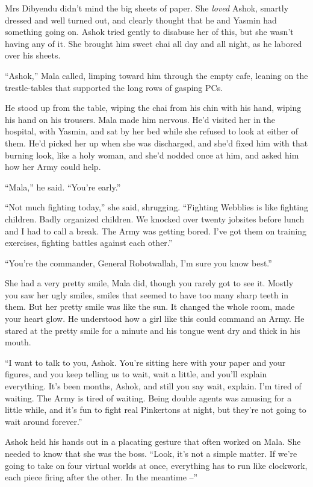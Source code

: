 Mrs Dibyendu didn't mind the big sheets of paper. She \emph{loved}
Ashok, smartly dressed and well turned out, and clearly thought
that he and Yasmin had something going on. Ashok tried gently to
disabuse her of this, but she wasn't having any of it. She brought
him sweet chai all day and all night, as he labored over his
sheets.

``Ashok,'' Mala called, limping toward him through the empty cafe,
leaning on the trestle-tables that supported the long rows of
gasping PCs.

He stood up from the table, wiping the chai from his chin with his
hand, wiping his hand on his trousers. Mala made him nervous. He'd
visited her in the hospital, with Yasmin, and sat by her bed while
she refused to look at either of them. He'd picked her up when she
was discharged, and she'd fixed him with that burning look, like a
holy woman, and she'd nodded once at him, and asked him how her
Army could help.

``Mala,'' he said. ``You're early.''

``Not much fighting today,'' she said, shrugging. ``Fighting Webblies
is like fighting children. Badly organized children. We knocked
over twenty jobsites before lunch and I had to call a break. The
Army was getting bored. I've got them on training exercises,
fighting battles against each other.''

``You're the commander, General Robotwallah, I'm sure you know
best.''

She had a very pretty smile, Mala did, though you rarely got to see
it. Mostly you saw her ugly smiles, smiles that seemed to have too
many sharp teeth in them. But her pretty smile was like the sun. It
changed the whole room, made your heart glow. He understood how a
girl like this could command an Army. He stared at the pretty smile
for a minute and his tongue went dry and thick in his mouth.

``I want to talk to you, Ashok. You're sitting here with your paper
and your figures, and you keep telling us to wait, wait a little,
and you'll explain everything. It's been months, Ashok, and still
you say wait, explain. I'm tired of waiting. The Army is tired of
waiting. Being double agents was amusing for a little while, and
it's fun to fight real Pinkertons at night, but they're not going
to wait around forever.''

Ashok held his hands out in a placating gesture that often worked
on Mala. She needed to know that she was the boss. ``Look, it's not
a simple matter. If we're going to take on four virtual worlds at
once, everything has to run like clockwork, each piece firing after
the other. In the meantime --''

